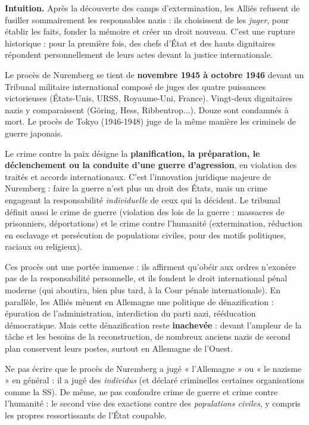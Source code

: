 \documentclass[11pt]{article}
\newcommand{\cle}[1]{{\popxbold\color{popdark}#1}}
\begin{document}
\textbf{Intuition.} Après la découverte des camps d'extermination, les Alliés refusent de fusiller sommairement les responsables nazis : ils choisissent de les \emph{juger}, pour établir les faits, fonder la mémoire et créer un droit nouveau. C'est une rupture historique : pour la première fois, des chefs d'État et des hauts dignitaires répondent personnellement de leurs actes devant la justice internationale.

Le \cle{procès de Nuremberg} se tient de \textbf{novembre 1945 à octobre 1946} devant un Tribunal militaire international composé de juges des quatre puissances victorieuses (États-Unis, URSS, Royaume-Uni, France). Vingt-deux dignitaires nazis y comparaissent (Göring, Hess, Ribbentrop...). Douze sont condamnés à mort. Le \cle{procès de Tokyo} (1946-1948) juge de la même manière les criminels de guerre japonais.

\begin{definition}
Le \cle{crime contre la paix} désigne la \textbf{planification, la préparation, le déclenchement ou la conduite d'une guerre d'agression}, en violation des traités et accords internationaux. C'est l'innovation juridique majeure de Nuremberg : faire la guerre n'est plus un droit des États, mais un crime engageant la responsabilité \emph{individuelle} de ceux qui la décident. Le tribunal définit aussi le \cle{crime de guerre} (violation des lois de la guerre : massacres de prisonniers, déportations) et le \cle{crime contre l'humanité} (extermination, réduction en esclavage et persécution de populations civiles, pour des motifs politiques, raciaux ou religieux).
\end{definition}

Ces procès ont une portée immense : ils affirment qu'obéir aux ordres n'exonère pas de la responsabilité personnelle, et ils fondent le droit international pénal moderne (qui aboutira, bien plus tard, à la Cour pénale internationale). En parallèle, les Alliés mènent en Allemagne une politique de \cle{dénazification} : épuration de l'administration, interdiction du parti nazi, rééducation démocratique. Mais cette dénazification reste \textbf{inachevée} : devant l'ampleur de la tâche et les besoins de la reconstruction, de nombreux anciens nazis de second plan conservent leurs postes, surtout en Allemagne de l'Ouest.

\begin{attention}
Ne pas écrire que le procès de Nuremberg a jugé « l'Allemagne » ou « le nazisme » en général : il a jugé des \emph{individus} (et déclaré criminelles certaines organisations comme la SS). De même, ne pas confondre crime de guerre et crime contre l'humanité : le second vise des exactions contre des \emph{populations civiles}, y compris les propres ressortissants de l'État coupable.
\end{attention}
\end{document}
